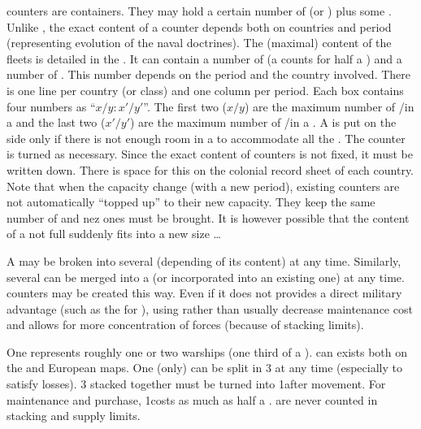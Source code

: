 \aparag[Fleets.] \FLEET counters are containers. They may hold a certain
number of \NWD (or \NGD) plus some \NTD.
\bparag Unlike \ARMY, the exact content of a \FLEET counter depends both on
countries and period (representing evolution of the naval doctrines).
\bparag The (maximal) content of the fleets is detailed in the
. It can contain a number of \NWD (a
\NGD counts for half a \NWD) and a number of \NTD. This number depends on the
period and the country involved.
\bparag There is one line per country (or class) and one column per
period. Each box contains four numbers as ``$x/y:x'/y'$''. The first two
($x/y$) are the maximum number of \NWD/\NTD in a \FLEET\facemoins and the last
two ($x'/y'$) are the maximum number of \NWD/\NTD in a \FLEET\faceplus.
\bparag A \FLEET is put on the side \Faceplus only if there is not enough room
in a \FLEET\facemoins to accommodate all the \ND. The counter is turned as
necessary.
\bparag Since the exact content of \FLEET counters is not fixed, it must be
written down. There is space for this on the colonial record sheet of each
country.
\bparag Note that when the capacity change (with a new period), existing
\FLEET counters are not automatically ``topped up'' to their new
capacity. They keep the same number of \ND and nez ones must be brought. It is
however possible that the content of a not full \FLEET\Faceplus suddenly fits
into a new size \FLEET\Facemoins\ldots


 A \FLEET may be broken into several \ND
(depending of its content) at any time.
\bparag Similarly, several \ND can be merged into a \FLEET (or incorporated
into an existing one) at any time. \FLEET counters may be created this way.
\bparag Even if it does not provides a direct military advantage (such as the
 for \ARMY), using \FLEET rather than \ND usually
decrease maintenance cost and allows for more concentration of forces (because
of stacking limits).

 One \NDE represents roughly one or two
warships (one third of a \NWD).
\bparag \NDE can exists both on the \ROTW and European maps.
\bparag One \NWD (only) can be split in 3 \NDE at any time (especially to
satisfy losses). 3 \NDE stacked together must be turned into 1\NWD after
movement.
\bparag For maintenance and purchase, 1\NDE costs as much as half a \NWD.
\bparag \NDE are never counted in stacking and supply limits.

